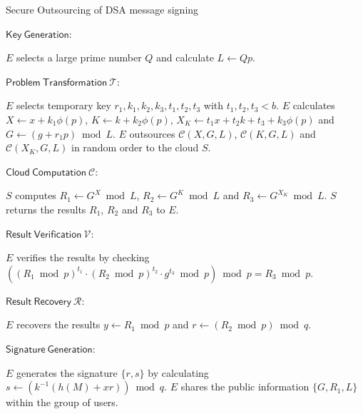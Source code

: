\documentclass[english,draftcls,onecolumn,11pt]{IEEEtran}
\theoremstyle{definition}
\theoremstyle{plain}
\theoremstyle{plain}
\theoremstyle{definition}
\begin{document}
\begin{algorithm}[h] 
\caption{Secure Outsourcing of DSA message signing\label{alg:SecureDSA-Sign}}

\smallskip 
$\mathsf{Key~Generation}$:  
\begin{algorithmic}[1] 
\STATE $E$ selects a large prime number $Q$ and calculate $L\leftarrow Qp$. 
\end{algorithmic} 

\smallskip 
$\mathsf{Problem~Transformation}~\mathcal{T}$:  
\begin{algorithmic}[1] 
\STATE $E$ selects temporary key $r_1,k_1,k_2,k_3,t_1,t_2,t_3$ with $t_1,t_2,t_3<b$. 
\STATE $E$ calculates $X\leftarrow x+k_1\phi(p)$, $K\leftarrow k+k_2\phi(p)$, $X_K\leftarrow t_1x+t_2k+t_3+k_3\phi(p)$ and $G\leftarrow (g+r_1p)\bmod L$.
\STATE $E$ outsources $\mathcal{C}(X,G,L)$, $\mathcal{C}(K,G,L)$ and $\mathcal{C}(X_K,G,L)$ in random order to the cloud $S$.
\end{algorithmic} 

\smallskip
$\mathsf{Cloud~Computation}~\mathcal{C}$:
\begin{algorithmic}[1] 
\STATE $S$ computes $R_1\leftarrow G^X\bmod L$, $R_2\leftarrow G^K\bmod L$ and $R_3\leftarrow G^{X_K}\bmod L$.
\STATE $S$ returns the results $R_1$, $R_2$ and $R_3$ to $E$.
\end{algorithmic} 

\smallskip
$\mathsf{Result~Verification}~\mathcal{V}$:
\begin{algorithmic}[1] 
\STATE $E$ verifies the results by checking $((R_1\bmod p)^{t_1}\cdot(R_2\bmod p)^{t_2}\cdot g^{t_3}\bmod p)\bmod p=R_3\bmod p$.
\end{algorithmic} 

\smallskip
$\mathsf{Result~Recovery}~\mathcal{R}$:
\begin{algorithmic}[1] 
\STATE $E$ recovers the results $y\leftarrow R_1\bmod p$ and $r\leftarrow (R_2\bmod p)\bmod q$.
\end{algorithmic} 

\smallskip
$\mathsf{Signature~Generation}$: 
\begin{algorithmic}[1] 
\STATE $E$ generates the signature $\{r,s\}$ by calculating $s\leftarrow (k^{-1}(h(M)+xr))\bmod q$. 
\STATE $E$ shares the public information $\{G,R_1,L\}$ within the group of users.
\end{algorithmic}
\end{algorithm}
\end{document}
